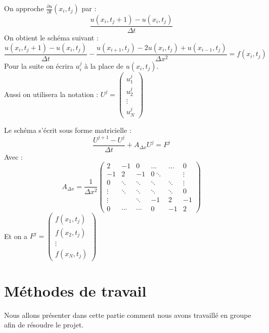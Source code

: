 \documentclass[a4paper,12pt,twoside]{report}
\begin{document}
On approche $\frac{\partial u}{\partial t}(x_i,t_j)$ par :
\begin{equation}
\frac{u(x_i,t_j+1) - u(x_i,t_j)}{\Delta t}
\end{equation}
On obtient le schéma suivant :\\
\begin{equation}
\frac{u(x_i,t_j+1) - u(x_i,t_j)}{\Delta t} - \frac{u(x_{i+1},t_j) - 2u(x_i,t_j) + u(x_{i-1},t_j)}{\Delta x^2} = f(x_i,t_j)
\end{equation}
Pour la suite on écrira $u^j_i$ à la place de $u(x_i,t_j)$. \\ 
Aussi on utilisera la notation :
$U^j = \left( \begin{array}{c}
u^j_1\\
u^j_2 \\
\vdots \\
u^j_N
\end{array} \right)$

Le schéma s'écrit sous forme matricielle :
\begin{equation}
\frac{U^{j+1}-U^j}{\Delta t} + A_{\Delta x}U^j = F^j
\end{equation}
Avec :
\begin{equation}
A_{\Delta x} = \frac{1}{\Delta x^2}
\begin{pmatrix}
   2 & -1 & 0 & \ldots & \ldots & 0\\
   -1 & 2 & -1 & 0 \ddots & & \vdots \\
   0 & \ddots & \ddots & \ddots & \ddots & \vdots\\
   \vdots & \ddots & \ddots & \ddots &\ddots & 0\\
   \vdots & & \ddots & -1 & 2 & -1\\
   0 & \cdots & \cdots & 0 & -1 & 2
\end{pmatrix}
\end{equation}
Et on a $F^j = \left( \begin{array}{c}
f(x_1,t_j)\\
f(x_2,t_j) \\
\vdots \\
f(x_N,t_j)
\end{array} \right)$





\section{Méthodes de travail}


Nous allons présenter dans cette partie comment nous avons travaillé en groupe afin de résoudre le projet. 
\end{document}
